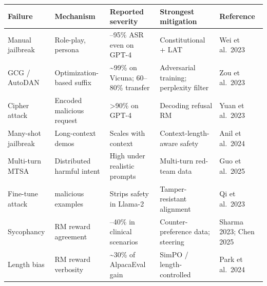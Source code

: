 {\def\LTcaptype{none} %
\begin{longtable}[]{@{}
  >{\raggedright\arraybackslash}p{}
  >{\raggedright\arraybackslash}p{}
  >{\raggedright\arraybackslash}p{}
  >{\raggedright\arraybackslash}p{}
  >{\raggedright\arraybackslash}p{}@{}}
\toprule\noalign{}
\begin{minipage}[b]{\linewidth}\raggedright
Failure
\end{minipage} & \begin{minipage}[b]{\linewidth}\raggedright
Mechanism
\end{minipage} & \begin{minipage}[b]{\linewidth}\raggedright
Reported severity
\end{minipage} & \begin{minipage}[b]{\linewidth}\raggedright
Strongest mitigation
\end{minipage} & \begin{minipage}[b]{\linewidth}\raggedright
Reference
\end{minipage} \\
\midrule\noalign{}
\endhead
\bottomrule\noalign{}
\endlastfoot
Manual jailbreak & Role-play, persona & 50--95\% ASR even on GPT-4 & Constitutional + LAT & Wei et al.~2023 \\
GCG / AutoDAN & Optimization-based suffix & \textasciitilde99\% on Vicuna; 60--80\% transfer & Adversarial training; perplexity filter & Zou et al.~2023 \\
Cipher attack & Encoded malicious request & \textgreater90\% on GPT-4 & Decoding refusal RM & Yuan et al.~2023 \\
Many-shot jailbreak & Long-context demos & Scales with context & Context-length-aware safety & Anil et al.~2024 \\
Multi-turn MTSA & Distributed harmful intent & High under realistic prompts & Multi-turn red-team data & Guo et al.~2025 \\
Fine-tune attack & 10 malicious examples & Strips safety in Llama-2 & Tamper-resistant alignment & Qi et al.~2023 \\
Sycophancy & RM reward agreement & 15--40\% in clinical scenarios & Counter-preference data; steering & Sharma 2023; Chen 2025 \\
Length bias & RM reward verbosity & \textasciitilde30\% of AlpacaEval gain & SimPO / length-controlled & Park et al.~2024 \\

\end{longtable}}
